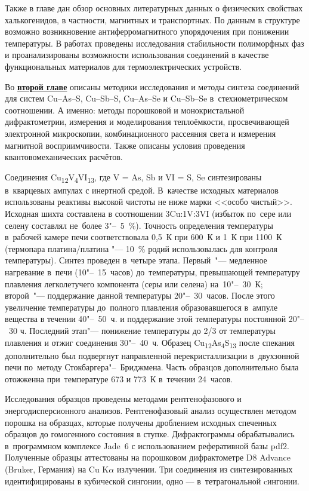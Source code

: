 Также в главе дан обзор основных литературных данных о физических свойствах халькогенидов, в частности,  магнитных и транспортных\cite{bab_81}.
По данным \cite{bab_1982,DiBenedetto2002, Bernardini2000,Gainov2008} в структуре возможно возникновение антиферромагнитного упорядочения при понижении температуры. В работах \cite{Lu2013,Lara-Curzio2014,Tablero2014,Lu2016,Nasonova2016} проведены исследования стабильности полиморфных фаз и проанализированы возможности использования соединений в качестве функциональных материалов для термоэлектрических устройств.



Во \underline{\textbf{второй главе}} описаны методики исследования и методы синтеза соединений для систем Cu--As--S, Cu--Sb--S, Cu--As--Se и Cu--Sb--Se в~стехиометрическом соотношении.
А именно: методы порошковой и монокристальной дифрактометрии, измерения и моделирования теплоёмкости, просвечивающей электронной микроскопии, комбинационного рассеяния света и измерения магнитной восприимчивости. Также описаны условия проведения квантовомеханических расчётов.

Соединения Cu\textsubscript{12}V\textsubscript{4}VI\textsubscript{13}, где V = As, Sb и VI = S, Se синтезированы в~кварцевых ампулах с инертной средой. В~качестве исходных материалов использованы реактивы высокой чистоты не ниже марки <<особо чистый>>. Исходная шихта составлена в соотношении 3Cu:1V:3VI
(избыток по~сере или селену составлял не~более 3"--~5~\%). Точность определения температуры в~рабочей камере печи соответствовала 0,5~К при 600~К и 1~К при 1100~К (термопара платина/платина "--- 10~\% родий использовалась для контроля температуры). Синтез проведен в~четыре этапа. Первый~"--- медленное нагревание в~печи (10"--~15~часов) до~температуры, превышающей температуру плавления легколетучего компонента (серы или селена) на~10"--~30~К; второй~"--- поддержание данной температуры 20"--~30~часов. После этого увеличение температуры до~полного плавления образовавшегося в~ампуле вещества в течении 40"--~50~ч. и поддержание этой температуры постоянной 20"--~30 ч. Последний этап"--- понижение температуры до 2/3 от температуры плавления и отжиг соединения 30"--~40~ч. Образец Cu\textsubscript{12}As\textsubscript{4}S\textsubscript{13} после спекания дополнительно был подвергнут направленной перекристаллизации в~двухзонной печи по~методу Стокбаргера"--~Бриджмена. Часть образцов дополнительно была отожженна при~температуре 673 и 773~К в~течении 24~часов.

Исследования образцов проведены методами рентгенофазового и энергодисперсионного анализов.
Рентгенофазовый анализ осуществлен методом порошка на образцах, которые  получены дроблением исходных спеченных образцов до гомогенного состояния в ступке. Дифрактограммы  обрабатывались в~программном комплексе Jade~6 с использованием реферативной базы pdf2. Полученные образцы аттестованы на порошковом дифрактометре D8 Advance (Bruker, Германия) на Cu K$\alpha$ излучении. Три соединения из синтезированных  идентифицированы в кубической сингонии, одно --- в~тетрагональной cингонии.

